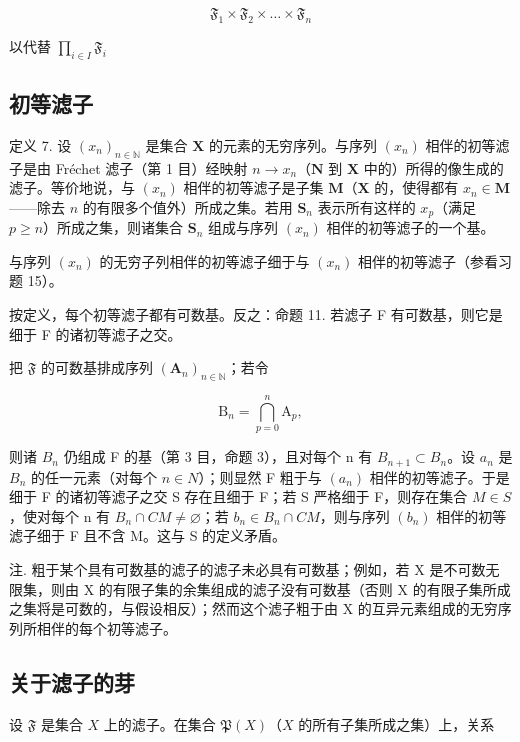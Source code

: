 \[
\mathfrak {F} _ {1} \times \mathfrak {F} _ {2} \times \dots \times \mathfrak {F} _ {n}
\]

以代替 \(\prod_{i\in I}\mathfrak{F}_i\)

\subsection{初等滤子}

定义 7. 设 \((x_{n})_{n\in \mathbb{N}}\) 是集合 \(\mathbf{X}\) 的元素的无穷序列。与序列 \((x_{n})\) 相伴的初等滤子是由 Fréchet 滤子（第 1 目）经映射 \(n\to x_n\)（\(\mathbf{N}\) 到 \(\mathbf{X}\) 中的）所得的像生成的滤子。等价地说，与 \((x_{n})\) 相伴的初等滤子是子集 \(\mathbf{M}\)（\(\mathbf{X}\) 的，使得都有 \(x_{n}\in \mathbf{M}\)——除去 \(n\) 的有限多个值外）所成之集。若用 \(\mathbf{S}_n\) 表示所有这样的 \(x_{p}\)（满足 \(p\geqslant n\)）所成之集，则诸集合 \(\mathbf{S}_n\) 组成与序列 \((x_{n})\) 相伴的初等滤子的一个基。

与序列 \((x_{n})\) 的无穷子列相伴的初等滤子细于与 \((x_{n})\) 相伴的初等滤子（参看习题 15）。

按定义，每个初等滤子都有可数基。反之：命题 11. 若滤子 F 有可数基，则它是细于 F 的诸初等滤子之交。

把 \(\mathfrak{F}\) 的可数基排成序列 \((\mathbf{A}_n)_{n\in \mathbb{N}}\)；若令

\[
\mathrm{B} _ {n} = \bigcap_ {p = 0} ^ {n} \mathrm{A} _ {p},
\]

则诸 \(B_{n}\) 仍组成 F 的基（第 3 目，命题 3），且对每个 n 有 \(B_{n+1} \subset B_{n}\)。设 \(a_{n}\) 是 \(B_{n}\) 的任一元素（对每个 \(n \in N\)）；则显然 F 粗于与 \((a_{n})\) 相伴的初等滤子。于是细于 F 的诸初等滤子之交 S 存在且细于 F；若 S 严格细于 F，则存在集合 \(M \in S\)，使对每个 n 有 \(B_{n} \cap CM \neq \varnothing\)；若 \(b_{n} \in B_{n} \cap CM\)，则与序列 \((b_{n})\) 相伴的初等滤子细于 F 且不含 M。这与 S 的定义矛盾。

注. 粗于某个具有可数基的滤子的滤子未必具有可数基；例如，若 X 是不可数无限集，则由 X 的有限子集的余集组成的滤子没有可数基（否则 X 的有限子集所成之集将是可数的，与假设相反）；然而这个滤子粗于由 X 的互异元素组成的无穷序列所相伴的每个初等滤子。

\subsection{关于滤子的芽}

设 \(\mathfrak{F}\) 是集合 \(X\) 上的滤子。在集合 \(\mathfrak{P}(X)\)（\(X\) 的所有子集所成之集）上，关系

